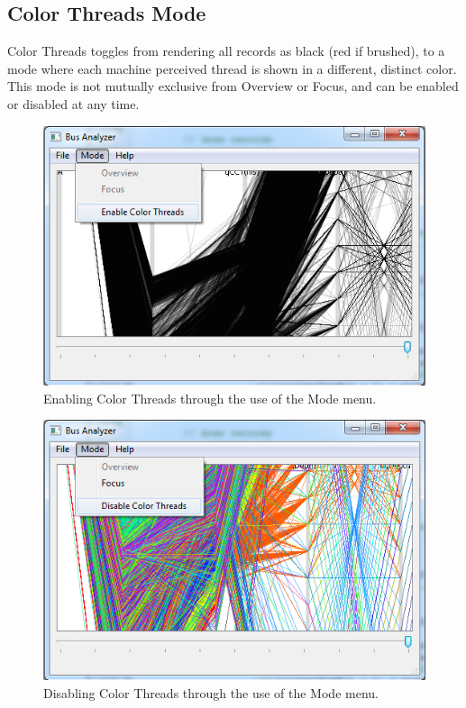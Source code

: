 \documentclass[12pt]{ucthesis}
\begin{document}
\subsection{Color Threads Mode}
Color Threads toggles from rendering all records as black (red if brushed), to a mode where each machine perceived thread is shown in a different, distinct color. This mode is not mutually exclusive from Overview or Focus, and can be enabled or disabled at any time.

\begin{figure}[htb!]
 \centering
 \includegraphics[width=\textwidth]{images/documentation/enable_color.jpg}
 \caption[Enabling Color Threads through the use of the Mode menu.]{Enabling Color Threads through the use of the Mode menu.}
 \label{fig:doc}
\end{figure}

\begin{figure}[htb!]
 \centering
 \includegraphics[width=\textwidth]{images/documentation/disable_color.jpg}
 \caption[Disabling Color Threads through the use of the Mode menu.]{Disabling Color Threads through the use of the Mode menu.}
 \label{fig:doc}
\end{figure}
\end{document}
